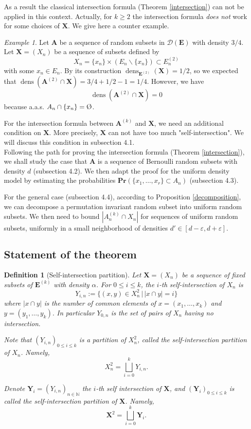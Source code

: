 \documentclass{article}
\DeclareMathOperator{\dens}{dens}
\newcommand{\vide}{\textup{\O}}
\newcommand{\bs}{\boldsymbol}
\def\Pr{\mathbf{Pr}}
\newtheorem{defi}[thm]{Definition}
\theoremstyle{remark}
\newtheorem{ex}[thm]{Example}
\begin{document}
As a result the classical intersection formula (Theorem \ref{intersection}) can not be applied in this context. Actually, for $k\geq 2$ the intersection formula \textit{does not} work for some choices of $\bs X$. We give here a counter example. 

\begin{ex}\label{cex no intersection formula}
Let $\bs A$ be a sequence of random subsets in $\mathcal{D}(\bs E)$ with density $3/4$. Let $\bs X = (X_n)$ be a sequence of subsets defined by 
\[X_n = \{x_n\}\times (E_n\backslash\{x_n\})\subset E_n^{(2)}\]
with some $x_n\in E_n$. By its construction $\dens_{\bs E^{(2)}}(\bs X) = 1/2$, so we expected that $\dens(\bs A^{(2)} \cap \bs X) = 3/4+1/2-1=1/4$. However, we have \[\dens(\bs A^{(2)} \cap \bs X) = 0\]
because a.a.s. $A_n \cap \{x_n\} = \vide$.
\end{ex}\quad

For the intersection formula between $\bs A^{(k)}$ and $\bs X$, we need an additional condition on $\bs X$. More precisely, $\bs X$ can not have too much "self-intersection". We will discuss this condition in subsection 4.1.\\

Following the path for proving the intersection formula (Theorem \ref{intersection}), we shall study the case that $\bs A$ is a sequence of Bernoulli random subsets with density $d$ (subsection 4.2). We then adapt the proof for the uniform density model by estimating the probabilities $\Pr\left(\{x_1,\dots,x_r\}\subset A_n\right)$ (subsection 4.3).

For the general case (subsection 4.4), according to Proposition \ref{decomposition}, we can decompose a permutation invariant random subset into uniform random subsets. We then need to bound $|A_n^{(k)}\cap X_n|$ for sequences of uniform random subsets, uniformly in a small neighborhood of densities $d'\in [d-\varepsilon,d+\varepsilon]$.

\subsection{Statement of the theorem}

\begin{defi}[Self-intersection partition] Let $\bs X = (X_n)$ be a sequence of fixed subsets of $\bs E^{(k)}$ with density $\alpha$. For $0\leq i \leq k$, the $i$-th self-intersection of $X_n$ is
\[Y_{i,n} := \{(x,y)\in X_n^2\,|\, |x\cap y| = i\}\]
where $|x\cap y|$ is the number of common elements of $x = (x_1,\dots,x_k)$ and $y = (y_1,\dots,y_k)$. In particular $Y_{0,n}$ is the set of pairs of $X_n$ having no intersection. 

Note that $(Y_{i,n})_{0\leq i \leq k}$ is a partition of $X_n^2$, called the self-intersection partition of $X_n$. Namely,
\[X_n^2 = \bigsqcup_{i=0}^k Y_{i,n}.\]

Denote $\bs Y_i = (Y_{i,n})_{n\in \mathbb{N}}$ the $i$-th self intersection of $\bs X$, and  $(\bs Y_i)_{0\leq i \leq k}$ is called the self-intersection partition of $\bs X$. Namely,
\[\bs X^2 = \bigsqcup_{i=0}^k \bs Y_i.\]
\end{defi}\quad
\end{document}
